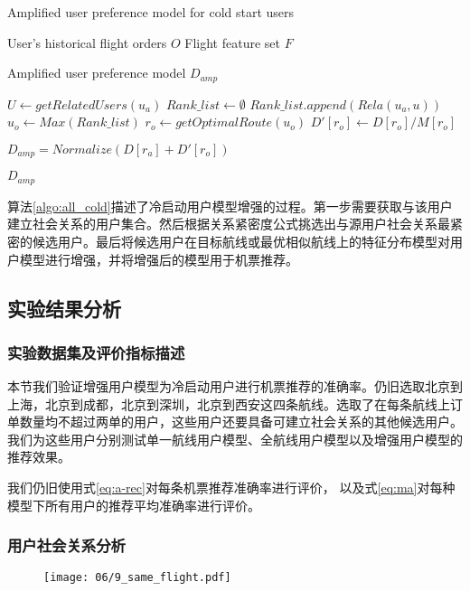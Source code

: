 \begin{algorithm}
\caption{Amplified user preference model for cold start users}
\label{algo:all_cold}
\begin{algorithmic}[1]
\Require
\Statex User's historical flight orders $O$
\Statex Flight feature set $F$

\Ensure 
\Statex Amplified user preference model $D_{amp}$

\State $U \gets getRelatedUsers(u_a)$
\State $Rank\_list \gets \emptyset$
\State $Rank\_list.append(Rela(u_a,u)) $
\EndFor
\State $u_o \gets Max(Rank\_list)$
\State $r_o \gets getOptimalRoute(u_o)$
\State $D'[r_o] \gets D[r_o] / M[r_o]$

\State $D_{amp} = Normalize(D[r_a] + D'[r_o])$

\State \Return $D_{amp}$
\end{algorithmic}
\end{algorithm}

算法\ref{algo:all_cold}描述了冷启动用户模型增强的过程。第一步需要获取与该用户建立社会关系的用户集合。然后根据关系紧密度公式挑选出与源用户社会关系最紧密的候选用户。最后将候选用户在目标航线或最优相似航线上的特征分布模型对用户模型进行增强，并将增强后的模型用于机票推荐。

\subsection{实验结果分析}

\subsubsection{实验数据集及评价指标描述}

本节我们验证增强用户模型为冷启动用户进行机票推荐的准确率。仍旧选取北京到上海，北京到成都，北京到深圳，北京到西安这四条航线。选取了在每条航线上订单数量均不超过两单的用户，这些用户还要具备可建立社会关系的其他候选用户。我们为这些用户分别测试单一航线用户模型、全航线用户模型以及增强用户模型的推荐效果。

我们仍旧使用式\ref{eq:a-rec}对每条机票推荐准确率进行评价，
以及式\ref{eq:ma}对每种模型下所有用户的推荐平均准确率进行评价。

\subsubsection{用户社会关系分析}

\begin{figure}
 \centering
 \texttt{[image: 06/9\_same\_flight.pdf]}
\end{figure}

